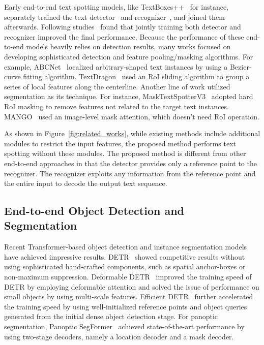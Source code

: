 \documentclass[10pt,twocolumn,letterpaper]{article}
\newcommand{\Figure}[1]{Figure~\ref{fig:#1}}
\begin{document}
Early end-to-end text spotting models, like TextBoxes++~\cite{liao2018textboxes++} for instance, separately trained the text detector~\cite{liao2017textboxes} and recognizer~\cite{CRNN}, and joined them afterwards. Following studies~\cite{liu2018fots,baek2020character,liao2020mask,liu2020abcnet} found that jointly training both detector and recognizer improved the final performance. Because the performance of these end-to-end models heavily relies on detection results, many works focused on developing sophisticated detection and feature pooling/masking algorithms. For example, ABCNet~\cite{liu2020abcnet} localized arbitrary-shaped text instances by using a Bezier-curve fitting algorithm. TextDragon~\cite{feng2019textdragon} used an RoI sliding algorithm to group a series of local features along the centerline. Another line of work utilized segmentation as its technique. For instance, MaskTextSpotterV3~\cite{liao2020mask} adopted hard RoI masking to remove features not related to the target text instances. MANGO~\cite{qiao2020mango} used an image-level mask attention, which doesn't need RoI operation.





As shown in \Figure{related_works}, while existing methods include additional modules to restrict the input features, the proposed method performs text spotting without these modules.
The proposed method is different from other end-to-end approaches in that the detector provides only a reference point to the recognizer. The recognizer exploits any information from the reference point and the entire input to decode the output text sequence.



\vspace{2mm}






\subsection{End-to-end Object Detection and Segmentation}
\label{ss:e2e_od}



Recent Transformer-based object detection and instance segmentation models have achieved impressive results.
DETR~\cite{carion2020end} showed competitive results without using sophisticated hand-crafted components, such as spatial anchor-boxes or non-maximum suppression.
Deformable DETR~\cite{zhu2021deformable} improved the training speed of DETR by employing deformable attention and solved the issue of performance on small objects by using multi-scale features.
Efficient DETR~\cite{yao2021efficient} further accelerated the training speed by using well-initialized reference points and object queries generated from the initial dense object detection stage.
For panoptic segmentation, Panoptic SegFormer~\cite{li2021panoptic} achieved state-of-the-art performance by using two-stage decoders, namely a location decoder and a mask decoder.
\end{document}
